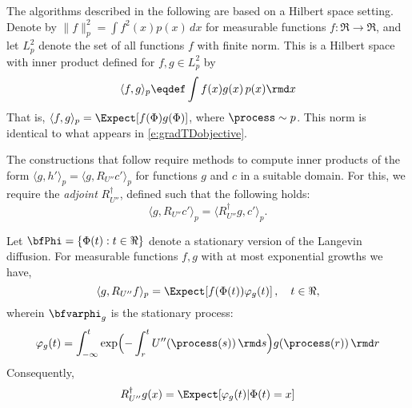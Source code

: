 The algorithms described in the following are based on a Hilbert space setting.   Denote by $\|f\|_p^{2} = \int f^2(x) p(x)\, dx$ for measurable functions $f\colon\Re\to\Re$, and let $L_p^2$ denote the set of all functions $f$
with finite norm.   This is a Hilbert space with inner product defined for $f,g\in L_p^2$ by
\begin{equation*}
\langle f,g \rangle_p \eqdef \int f(x)g(x)\, p(x)\rmd x
\end{equation*}
That is, $\langle f,g \rangle_p = \Expect[f(\Phi)g(\Phi)]$, where $\process\sim p$.   This norm is identical to what appears in  \eqref{e:gradTDobjective}.    


The constructions that follow require methods to compute inner products of the form $\langle g, h' \rangle_p = \langle g, R_{U''} c'\rangle_p $ for functions $g$ and $c$ in a  suitable domain.   For this, we require the \textit{adjoint} $R_{U''}^\dagger$, defined such that the following holds:
$$\langle g, R_{U''} c'\rangle_p = \langle R_{U''}^\dagger g, c'\rangle_p. $$

\begin{lemma}
	\label{t:adjointRG}
	Let $\bfPhi=\{\Phi(t) : t\in\Re\}$ denote a stationary version of the Langevin diffusion.
	For measurable functions $f,g$ with at most exponential growths we have,
	\begin{equation}
	\langle g, R_{U''} f \rangle_p   = \Expect [ f(\Phi(t))	\varphi_g(t)   ]\,, \quad t\in\Re,
	\label{e:t:adjointRG}
	\end{equation}
	wherein $\bfvarphi_g$ is the stationary process:
	\begin{equation}
	\varphi_g(t)
	=
	\int_{-\infty}^t  \exp\Bigl(-\int_r^t {U''}(\process(s))\, \rmd s  \Bigr) g(\process(r))   \,  \rmd r
	\label{eq_eligibility_vec}
	\end{equation}
	Consequently, 
	\[
	R_{U''}^\dagger g(x) = \Expect [\varphi_g(t)|\Phi(t)=x]
	\]
\end{lemma}

